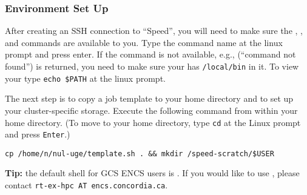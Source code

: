 ﻿%
\subsubsection{Environment Set Up}
\label{sect:envsetup}

After creating an SSH connection to ``Speed'', you will need to
make sure the , , and 
commands are available to you. 
Type the command name at the linux prompt and press enter.
If the command is not available, e.g.,  (``command not found'') is returned,
you need to make sure your  has \texttt{/local/bin} in it.
To view your  type \texttt{echo \$PATH} at the linux prompt.
%
%
%
%
%
%

The next step is to copy a job template to your home directory and to set up your
cluster-specific storage. Execute the following command from within your
home directory. (To move to your home directory, type \texttt{cd} at the Linux
prompt and press \texttt{Enter}.) 

\begin{verbatim}
cp /home/n/nul-uge/template.sh . && mkdir /speed-scratch/$USER
\end{verbatim}


\textbf{Tip:} the default shell for GCS ENCS users is .
If you would like to use , please contact 
\texttt{rt-ex-hpc AT encs.concordia.ca}.

